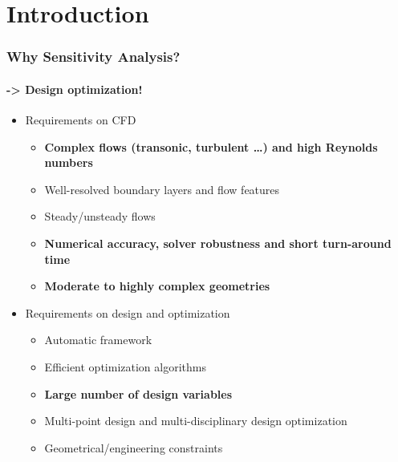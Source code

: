 \section{Introduction}


\begin{frame}
  \frametitle{Why Sensitivity Analysis?}
  \framesubtitle{-> Design optimization!}
  \begin{itemize}
    \item Requirements on CFD
      \begin{itemize}
      \item \textbf<2>{Complex flows (transonic, turbulent \dots) and high Reynolds numbers}
      \item Well-resolved boundary layers and flow features
      \item Steady/unsteady flows
      \item \textbf<3>{Numerical accuracy, solver robustness and short turn-around time}
      \item \textbf<2>{Moderate to highly complex geometries}
      \end{itemize}
    \item Requirements on design and optimization 
      \begin{itemize}
      \item Automatic framework
      \item Efficient optimization algorithms
      \item \textbf<3>{Large number of design variables}
      \item Multi-point design and multi-disciplinary design optimization
      \item Geometrical/engineering constraints 
      \end{itemize}
   \end{itemize}
   \\
\end{frame}


